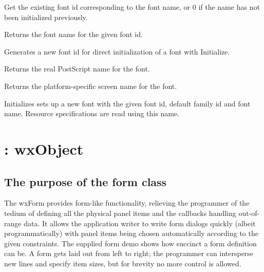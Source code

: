 Get the existing font id corresponding to the font name, or 0 if the name has not been
initialized previously.



Returns the font name for the given font id.



Generates a new font id for direct initialization of a
font with Initialize.



Returns the real PostScript name for the font.



Returns the platform-specific screen name for the font.




Initializes sets up a new font with the given font id, default family id
and font name. Resource specifications are read using this name.




\section{: wxObject}\label{wxform}

\subsection{The purpose of the form class}

The wxForm provides form-like functionality, relieving the
programmer of the tedium of defining all the physical panel items and
the callbacks handling out-of-range data. It allows the application
writer to write form dialogs quickly (albeit programmatically) with
panel items being chosen automatically according to the given
constraints. The supplied form demo shows how succinct a form
definition can be. A form gets laid out from left to right; the
programmer can intersperse new lines and specify item sizes, but for
brevity no more control is allowed.

